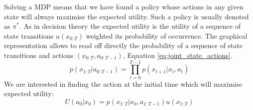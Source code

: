 Solving a MDP means that we have found a policy whose actions in any given state will always maximise the expected utility. Such 
a policy is usually denoted as $\pi^*$. As in decision theory the expected utility is the utility of a sequence of state transitions
$u(x_{0:T})$ weighted its probability of occurrence. The graphical representation allows to read off directly the probability 
of a sequence of state transitions and actions $(x_{0:T},a_{0:T-1})$, Equation \ref{eq:joint_state_actions}.
\begin{equation}\label{eq:joint_state_actions}
  p(x_{1:T}|a_{0:T-1}) = \prod_{t=0}^{T-1} p(x_{t+1}|x_t,a_t)
\end{equation}
We are interested in finding the action at the initial time which will maximise expected utility:
\begin{equation}
 U(a_{0}|x_0) = p(x_{1:T}|x_0,a_{1:T-1}) u(x_{1:T})
\end{equation}










